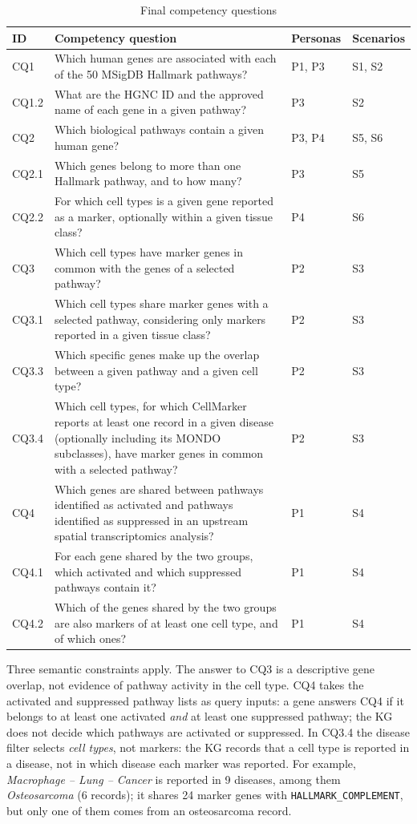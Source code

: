 \begin{table}[htbp]
\centering
\small
\begin{tabularx}{\linewidth}{|l|X|l|l|}
\hline
\textbf{ID} & \textbf{Competency question} & \textbf{Personas} & \textbf{Scenarios} \\ \hline
CQ1 & Which human genes are associated with each of the 50 MSigDB Hallmark pathways? & P1, P3 & S1, S2 \\ \hline
CQ1.2 & What are the HGNC ID and the approved name of each gene in a given pathway? & P3 & S2 \\ \hline
CQ2 & Which biological pathways contain a given human gene? & P3, P4 & S5, S6 \\ \hline
CQ2.1 & Which genes belong to more than one Hallmark pathway, and to how many? & P3 & S5 \\ \hline
CQ2.2 & For which cell types is a given gene reported as a marker, optionally within a given tissue class? & P4 & S6 \\ \hline
CQ3 & Which cell types have marker genes in common with the genes of a selected pathway? & P2 & S3 \\ \hline
CQ3.1 & Which cell types share marker genes with a selected pathway, considering only markers reported in a given tissue class? & P2 & S3 \\ \hline
CQ3.3 & Which specific genes make up the overlap between a given pathway and a given cell type? & P2 & S3 \\ \hline
CQ3.4 & Which cell types, for which CellMarker reports at least one record in a given disease (optionally including its MONDO subclasses), have marker genes in common with a selected pathway? & P2 & S3 \\ \hline
CQ4 & Which genes are shared between pathways identified as activated and pathways identified as suppressed in an upstream spatial transcriptomics analysis? & P1 & S4 \\ \hline
CQ4.1 & For each gene shared by the two groups, which activated and which suppressed pathways contain it? & P1 & S4 \\ \hline
CQ4.2 & Which of the genes shared by the two groups are also markers of at least one cell type, and of which ones? & P1 & S4 \\ \hline
\end{tabularx}
\caption{Final competency questions}
\label{tab:cqs}
\end{table}

\noindent Three semantic constraints apply. The answer to CQ3 is a descriptive gene overlap, not evidence of pathway activity in the cell type. CQ4 takes the activated and suppressed pathway lists as query inputs: a gene answers CQ4 if it belongs to at least one activated \emph{and} at least one suppressed pathway; the KG does not decide which pathways are activated or suppressed. In CQ3.4 the disease filter selects \emph{cell types}, not markers: the KG records that a cell type is reported in a disease, not in which disease each marker was reported. For example, \emph{Macrophage -- Lung -- Cancer} is reported in 9 diseases, among them \emph{Osteosarcoma} (6 records); it shares 24 marker genes with \texttt{HALLMARK\_COMPLEMENT}, but only one of them comes from an osteosarcoma record.

